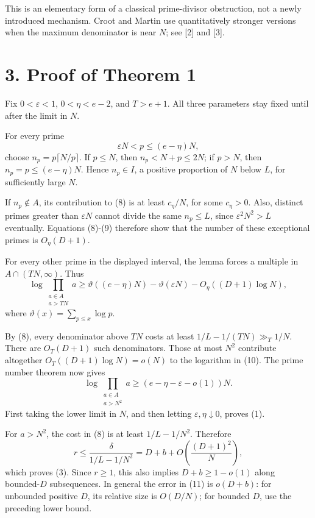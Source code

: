 \documentclass[11pt]{article}
\begin{document}
This is an elementary form of a classical prime-divisor obstruction, not a newly introduced mechanism. Croot and Martin use quantitatively stronger versions when the maximum denominator is near \(N\); see [2] and [3].

\section*{3. Proof of Theorem 1}

Fix \(0<\varepsilon<1\), \(0<\eta<e-2\), and \(T>e+1\). All three parameters stay fixed until after the limit in \(N\).

For every prime
\[
\varepsilon N<p\le(e-\eta)N,
\]
choose \(n_p=p\lceil N/p\rceil\). If \(p\le N\), then \(n_p< N+p\le2N\); if \(p>N\), then \(n_p=p\le(e-\eta)N\). Hence \(n_p\in I\), a positive proportion of \(N\) below \(L\), for sufficiently large \(N\).

If \(n_p\notin A\), its contribution to (8) is at least \(c_\eta/N\), for some \(c_\eta>0\). Also, distinct primes greater than \(\varepsilon N\) cannot divide the same \(n_p\le L\), since \(\varepsilon^2N^2>L\) eventually. Equations (8)-(9) therefore show that the number of these exceptional primes is \(O_\eta(D+1)\).

For every other prime in the displayed interval, the lemma forces a multiple in \(A\cap(TN,\infty)\). Thus
\[
\log\prod_{\substack{a\in A\\a>TN}}a
\ge \vartheta((e-\eta)N)-\vartheta(\varepsilon N)
      -O_\eta((D+1)\log N), \tag{10}
\]
where \(\vartheta(x)=\sum_{p\le x}\log p\).

By (8), every denominator above \(TN\) costs at least \(1/L-1/(TN)\gg_T1/N\). There are \(O_T(D+1)\) such denominators. Those at most \(N^2\) contribute altogether \(O_T((D+1)\log N)=o(N)\) to the logarithm in (10). The prime number theorem now gives
\[
\log\prod_{\substack{a\in A\\a>N^2}}a
\ge(e-\eta-\varepsilon-o(1))N.
\]
First taking the lower limit in \(N\), and then letting \(\varepsilon,\eta\downarrow0\), proves (1).

For \(a>N^2\), the cost in (8) is at least \(1/L-1/N^2\). Therefore
\[
r\le\frac{\delta}{1/L-1/N^2}
=D+b+O\!\left(\frac{(D+1)^2}{N}\right), \tag{11}
\]
which proves (3). Since \(r\ge1\), this also implies \(D+b\ge1-o(1)\) along bounded-\(D\) subsequences. In general the error in (11) is \(o(D+b)\): for unbounded positive \(D\), its relative size is \(O(D/N)\); for bounded \(D\), use the preceding lower bound.
\end{document}
